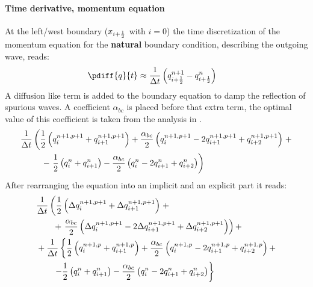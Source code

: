 \paragraph*{Time derivative, momentum equation}
At the left/west boundary ($x_{i+\frac{1}{2}}$ with $i=0$) the time discretization of the momentum equation for the \textbf{natural} boundary condition, describing the outgoing wave, reads:
\begin{align}
    \pdiff{q}{t} & \approx \frac{1}{\Dt} \left(  q^{n+1}_{i+\half} - q^{n}_{i+\half} \right)
\end{align}
A diffusion like term is added to the boundary equation to damp the reflection of spurious waves.
A coefficient $\alpha_{bc}$ is placed before that extra term, the optimal value of this coefficient is taken from the analysis in \citet{JanMooiman2025}.
\begin{align}
    & \frac{1}{\Delta t}\left( \frac{1}{2} \left( q^{n+1,p+1}_{i} + q^{n+1,p+1}_{i+1} \right)
    + \frac{\alpha_{bc}}{2} \left( q^{n+1,p+1}_{i} - 2 q^{n+1,p+1}_{i+1} + q^{n+1,p+1}_{i+2}  \right) \right. +
    \nonumber \\*
    & \qquad \,\,\, - \left.
    \frac{1}{2} \left( q^{n}_{i} + q^{n}_{i+1} \right) - \frac{\alpha_{bc}}{2}  \left( q^{n}_{i} - 2 q^{n}_{i+1} + q^{n}_{i+2}  \right)
    \right)
\end{align}
After rearranging the equation into an implicit and an explicit part it reads:
\begin{align}
    & \frac{1}{\Delta t}  \left( \frac{1}{2} \left( \Delta q^{n+1, p+1}_{i} + \Delta q^{n+1, p+1}_{i+1} \right) \right. +
    \nonumber \\*
    & \qquad + \left. \frac{\alpha_{bc}}{2}\left( \Delta q^{n+1,p+1}_{i} - 2 \Delta q^{n+1,p+1}_{i+1} + \Delta q^{n+1,p+1}_{i+2} \right) \right) +
    \nonumber \\
    & +  \frac{1}{\Delta t} \left\{ \frac{1}{2} \left( q^{n+1, p}_{i} + q^{n+1, p}_{i+1} \right) + \frac{\alpha_{bc}}{2}\left( q^{n+1,p}_{i} - 2 q^{n+1,p}_{i+1}  + q^{n+1,p}_{i+2} \right) + \right.
    \nonumber \\*
    & \qquad
    \left.  - \frac{1}{2} \left( q^{n}_{i} + q^{n}_{i+1} \right) - \frac{\alpha_{bc}}{2} \left( q^{n}_{i} - 2 q^{n}_{i+1} + q^{n}_{i+2}  \right) \right\}
\end{align}
